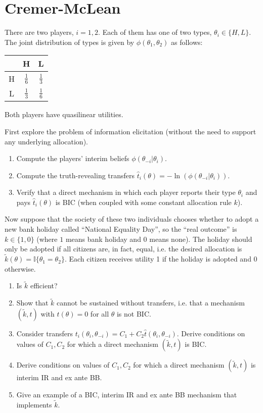 \documentclass[a4paper]{article}
\begin{document}
\section{Cremer-McLean}
	There are two players, $i=1,2$. Each of them has one of two types, $\theta_i \in \{H,L\}$. The joint distribution of types is given by $\phi(\theta_1,\theta_2)$ as follows:
	\begin{center}
		\begin{tabular}{c | c | c |}
			& H 				& L					\\ \hline
			H	& $\frac{1}{6}$ 	& $\frac{1}{3}$ 	\\ \hline
			L	& $\frac{1}{3}$ 	& $\frac{1}{6}$		\\ \hline
		\end{tabular}
	\end{center}
	Both players have quasilinear utilities.
	
	First explore the problem of information elicitation (without the need to support any underlying allocation). 
	\begin{enumerate}
		\item Compute the players' interim beliefs $\phi(\theta_{-i} | \theta_i)$.
		\item Compute the truth-revealing transfers $\hat{t}_i(\theta) = -\ln(\phi(\theta_{-i} | \theta_i))$.
		\item Verify that a direct mechanism in which each player reports their type $\theta_i$ and pays $\hat{t}_i(\theta)$ is BIC (when coupled with some constant allocation rule $k$).
	\end{enumerate}
	
	Now suppose that the society of these two individuals chooses whether to adopt a new bank holiday called ``National Equality Day'', so the ``real outcome'' is $k \in \{1,0\}$ (where $1$ means bank holiday and $0$ means none). The holiday should only be adopted if all citizens are, in fact, equal, i.e. the desired allocation is $\tilde{k}(\theta) = \mathbb{I} \{\theta_1 = \theta_2\}$. Each citizen receives utility 1 if the holiday is adopted and 0 otherwise.
	\begin{enumerate}[resume]
		\item Is $\tilde{k}$ efficient?
		\item Show that $\tilde{k}$ cannot be sustained without transfers, i.e. that a mechanism $(\tilde{k},t)$ with $t(\theta)=0$ for all $\theta$ is not BIC.
		\item Consider transfers $t_i(\theta_i,\theta_{-i}) = C_1 + C_2 \hat{t} (\theta_i,\theta_{-i})$. Derive conditions on values of $C_1,C_2$ for which a direct mechanism $(\tilde{k},t)$ is BIC.
		\item Derive conditions on values of $C_1,C_2$ for which a direct mechanism $(\tilde{k},t)$ is interim IR and ex ante BB.
		\item Give an example of a BIC, interim IR and ex ante BB mechanism that implements $\tilde{k}$.
	\end{enumerate}
\end{document}

